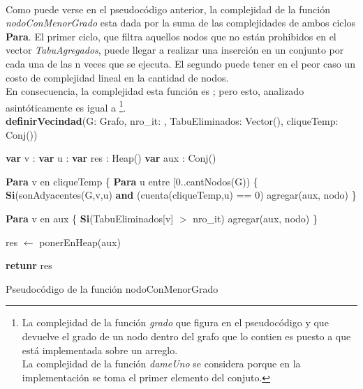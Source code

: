 \paragraph{}
Como puede verse en el pseudocódigo anterior, la complejidad de la función \textit{nodoConMenorGrado} esta dada por la suma de las complejidades de ambos ciclos \textbf{Para}. El primer ciclo, que filtra aquellos nodos que no están prohibidos en el vector \textit{TabuAgregados}, puede llegar a realizar una inserción en un conjunto por cada una de las n veces que se ejecuta. El segundo puede tener en el peor caso un costo de complejidad lineal en la cantidad de nodos. \\
En consecuencia, la complejidad esta función es ; pero esto, analizado asintóticamente es igual a  \footnote{La complejidad de la función \textit{grado} que figura en el pseudocódigo y que devuelve el grado de un nodo dentro del grafo que lo contien es  puesto a que está implementada sobre un arreglo.\\ La complejidad de la función \textit{dameUno} se considera  porque en la implementación se toma el primer elemento del conjuto.}.\\

\textbf{definirVecindad}(G: Grafo, nro\_it: \entero, TabuEliminados: Vector(\entero), cliqueTemp: Conj(\entero)) \\
\begin{algorithm}[H]
\footnotesize 
\linesnumbered
\incmargin{3em}

	\BlankLine
	\textbf{var} v : \entero												{}
	\textbf{var} u : \entero												{}
	\textbf{var} res : Heap(\entero)										
	\textbf{var} aux : Conj(\entero)										


	\BlankLine \BlankLine
	\textbf{Para} v en cliqueTemp \{		 								
	\tab \textbf{Para} u entre [0..cantNodos(G)) \{						
	\tab \tab \textbf{Si}(sonAdyacentes(G,v,u) \textbf{and} (cuenta(cliqueTemp,u) == 0) 
	\tab \tab \tab agregar(aux, nodo)									
	\}
	
	\BlankLine \BlankLine
	\textbf{Para} v en aux \{				 								
	\tab \textbf{Si}(TabuEliminados[v] $>$ nro\_it) 						
	\tab \tab agregar(aux, nodo)											
	\}

	\BlankLine \BlankLine
	res $\leftarrow$ ponerEnHeap(aux)									

	\BlankLine \BlankLine
	\textbf{retunr} res														
\caption{Pseudocódigo de la función nodoConMenorGrado} 
\end{algorithm}
\normalsize

